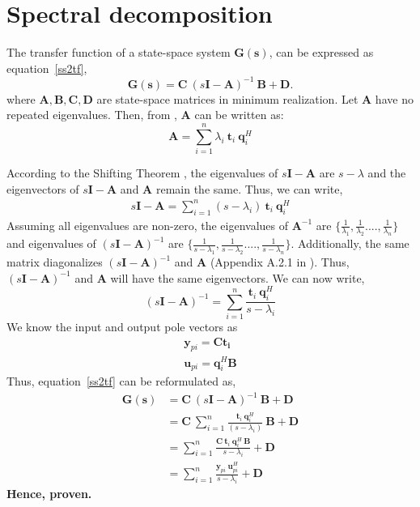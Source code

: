 \section{Spectral decomposition}
The transfer function of a state-space system $\mathbf{G(s)}$, can be expressed as equation~\eqref{ss2tf},
\begin{equation}
 \bm{G(s)} = \bm{C} \: (s\bm{I} - \bm{A})^{-1} \: \bm{B} + \bm{D} \text{.}
  \label{ss2tf}
\end{equation}
where $\bm{A}, \bm{B}, \bm{C}, \bm{D}$  are state-space matrices in minimum realization. Let $\bm{A}$  have no repeated eigenvalues. Then, from \cite{Sko05}, $\bm{A}$ can be written as:
\begin{equation}
\bm{A} = \sum_{i=1}^n \lambda_i \: \bm{t}_i\: \bm{q}_i^H 
\label{specDec1}
\end{equation}

According to the Shifting Theorem \cite{Bha12}, the eigenvalues of $s\bm{I}-\bm{A}$ are $s-\lambda$ and the eigenvectors of $s\bm{I}-\bm{A}$ and $\bm{A}$ remain the same. Thus, we can write,
\begin{align*}
  s\bm{I} - \bm{A} = \sum_{i=1}^n (s - \lambda_i) \: \bm{t}_i\: \bm{q}_i^H   
\end{align*}
    Assuming all eigenvalues are non-zero, the eigenvalues of $\bm{A}^{-1}$ are $\{\frac{1}{\lambda_1},\frac{1}{\lambda_2}....,\frac{1}{\lambda_n}\}$ and eigenvalues of $(s\bm{I} - \bm{A})^{-1}$ are $\{\frac{1}{s-\lambda_1},\frac{1}{s-\lambda_2}....,\frac{1}{s-\lambda_n}\}$. Additionally, the same matrix diagonalizes $(s\bm{I} - \bm{A})^{-1}$ and $\bm{A}$ (Appendix A.2.1 in \cite{Sko05}). Thus, $(s\bm{I} - \bm{A})^{-1}$ and $\bm{A}$ will have the same eigenvectors. We can now write,
\begin{equation}
(s\bm{I} - \bm{A})^{-1} = \sum_{i=1}^n \frac{\bm{t}_i\: \bm{q}_i^H}{s - \lambda_i} 
\label{specDec2}
\end{equation}
We know the input and output pole vectors as
\begin{align*}
\bm{y}_{pi} = \bm{C}\bm{t_i} \\
\bm{u}_{pi}= \bm{q}_{i}^H\bm{B} 
\end{align*}
Thus, equation~\eqref{ss2tf} can be reformulated as,
\begin{align*}
\bm{G(s)} &=  \bm{C} \: (s\bm{I} - \bm{A})^{-1} \: \bm{B} + \bm{D} \\
	&= \bm{C}\: \sum_{i=1}^n \frac{\bm{t}_i\: \bm{q}_i^H}{(s - \lambda_i)}\: \bm{B} + \bm{D} \\
	&= \sum_{i=1}^n \frac{\bm{C}\: \bm{t}_i\: \bm{q}_i^H\: \bm{B}}{s - \lambda_i} + \bm{D} \\
    &= \sum_{i=1}^n \frac{\bm{y}_{pi}\: \bm{u}_{pi}^H}{s - \lambda_i} + \bm{D} 
\end{align*}
\textbf{Hence, proven.}


